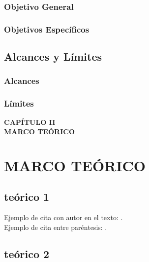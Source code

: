 \documentclass[12pt,oneside,letterpaper]{book}
\begin{document}
\subsection{Objetivo General}
\lipsum[1]

\subsection{Objetivos Específicos}
\lipsum[1]

\section{Alcances y Límites}
\lipsum[1]

\subsection{Alcances}
\lipsum[1]

\subsection{Límites}
\lipsum[1]

\newpage
\thispagestyle{empty}
\vspace*{0.35\textheight}
\begin{center}
	{\Huge\textbf{CAPÍTULO II}} \\[0.5cm]
	{\Huge\textbf{MARCO TEÓRICO}}
\end{center}

\newpage
\chapter{MARCO TEÓRICO}
\thispagestyle{fancy}
\section{teórico 1}
\lipsum[1]
Ejemplo de cita con autor en el texto: \textcite{perez2021educacion}.\\
Ejemplo de cita entre paréntesis: \parencite{smith2020ai}.

\section{teórico 2}
\lipsum[1]
\end{document}
